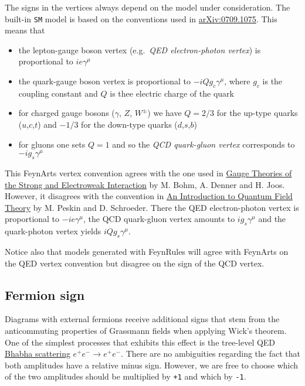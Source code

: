\documentclass[../FeynCalcManual.tex]{subfiles}
\begin{document}
The signs in the vertices always depend on the model under
consideration. The built-in \texttt{SM} model is based on the
conventions used in
\href{https://arxiv.org/abs/0709.1075v1}{arXiv:0709.1075}. This means
that

\begin{itemize}
\tightlist
\item
  the lepton-gauge boson vertex (e.g.~\emph{QED electron-photon vertex})
  is proportional to \(i e \gamma^\mu\)
\item
  the quark-gauge boson vertex is proportional to
  \(- i Q g_c \gamma^\mu\), where \(g_c\) is the coupling constant and
  \(Q\) is thee electric charge of the quark
\item
  for charged gauge bosons (\(\gamma\), \(Z\), \(W^{\pm}\)) we have
  \(Q = 2/3\) for the up-type quarks (\(u\),\(c\),\(t\)) and \(-1/3\)
  for the down-type quarks (\(d\),\(s\),\(b\))
\item
  for gluons one sets \(Q=1\) and so the \emph{QCD quark-gluon vertex}
  corresponds to \(- i g_s \gamma^\mu\)
\end{itemize}

This FeynArts vertex convention agrees with the one used in
\href{https://doi.org/10.1007/978-3-322-80160-9}{Gauge Theories of the
Strong and Electroweak Interaction} by M. Bohm, A. Denner and H. Joos.
However, it disagrees with the convention in
\href{https://doi.org/10.1201/9780429503559}{An Introduction to Quantum
Field Theory} by M. Peskin and D. Schroeder. There the QED
electron-photon vertex is proportional to \(- i e \gamma^\mu\), the QCD
quark-gluon vertex amounts to \(i g_s \gamma^\mu\) and the quark-photon
vertex yields \(i Q g_s \gamma^\mu\).

Notice also that models generated with FeynRules will agree with
FeynArts on the QED vertex convention but disagree on the sign of the
QCD vertex.

\subsection{Fermion sign}\label{fermion-sign}

Diagrams with external fermions receive additional signs that stem from
the anticommuting properties of Grassmann fields when applying Wick's
theorem. One of the simplest processes that exhibits this effect is the
tree-level QED
\href{https://en.wikipedia.org/wiki/Bhabha_scattering}{Bhabha
scattering} \(e^+ e^- \to e^+ e^-\). There are no ambiguities regarding
the fact that both amplitudes have a relative minus sign. However, we
are free to choose which of the two amplitudes should be multiplied by
\texttt{+1} and which by \texttt{-1}.
\end{document}
